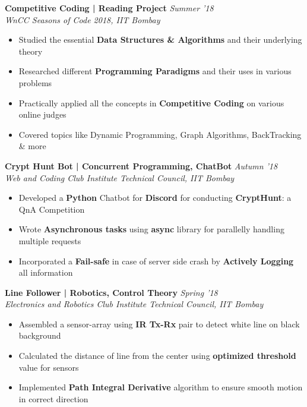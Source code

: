\documentclass[11pt]{article}%
\begin{document}
{\flushleft \bf \large{Competitive Coding | Reading Project}} \hfill {{{\em{Summer '18}}}} \\
{\em{WnCC Seasons of Code 2018, IIT Bombay}}
\vspace{-1mm}
\begin{itemize}
\setlength\itemsep{0.01em}
\vspace{-1mm}
\item Studied the essential {\bf Data Structures \& Algorithms} and their underlying theory 
\vspace{-1mm}
\item Researched different {\bf Programming Paradigms} and their uses in various problems
\vspace{-1mm}
\item Practically applied all the concepts in {\bf Competitive Coding} on various online judges
\vspace{-1mm}
\item Covered topics like Dynamic Programming, Graph Algorithms, BackTracking \& more
\end{itemize}
\vspace{-0.5cm}

{\flushleft \bf \large{Crypt Hunt Bot | Concurrent Programming, ChatBot}} \hfill  \hfill {{\em{Autumn '18} }}\\
{\em{Web and Coding Club {\textbar} Institute Technical Council, IIT Bombay}}
\begin{itemize}
\vspace{-2mm}
\setlength\itemsep{0.01em}
\item Developed a {\bf Python} Chatbot for {\bf Discord} for conducting {\bf CryptHunt}: a QnA Competition
\vspace{-1.2mm}
\item Wrote {\bf Asynchronous tasks} using {\bf async} library for parallelly handling multiple requests
\vspace{-1.2mm}
\item Incorporated a {\bf Fail-safe} in case of server side crash by {\bf Actively Logging}  all information
\end{itemize}
\vspace{-0.4cm}


{\flushleft \bf \large{Line Follower | Robotics, Control Theory}} \hfill  \hfill {{\em{Spring '18} }}\\
{\em{Electronics and Robotics Club {\textbar} Institute Technical Council, IIT Bombay}}
\begin{itemize}
\vspace{-2mm}
\setlength\itemsep{0.01em}
\item Assembled a sensor-array using {\bf IR Tx-Rx} pair to detect white line on black background
\vspace{-1.2mm}
\item Calculated the distance of line from the center using {\bf optimized threshold} value for sensors
\vspace{-1.2mm}
\item Implemented {\bf Path Integral Derivative} algorithm to ensure smooth motion in correct direction
\end{itemize}
\end{document}
